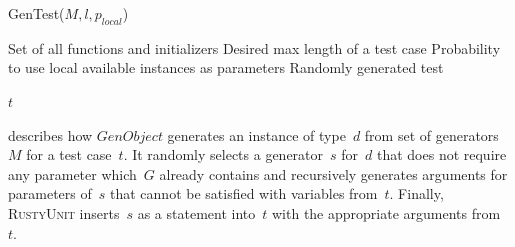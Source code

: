 \documentclass[paper=a4,%
  twoside,%
  BCOR4mm,%
  abstract=true,%
  toc=bibliography,%
  chapterprefix=true,%
  toc=bibliographynumbered,%
  open=right,%
  english,%
  pagesize=pdftex]{scrreprt}
\newcommand{\Desc}[2]{\State \makebox[2em][l]{#1}#2}
\newcommand{\tech}{\textsc{RustyUnit}\xspace}
\begin{document}
\begin{algorithm}[t]
\caption{GenTest($M, l, p_{local}$)}\label{alg:gentest}
\begin{algorithmic}
\Input
  \Desc{$M$}{Set of all functions and initializers}
  \Desc{$l$}{Desired max length of a test case}
  \Desc{$p_{local~}$}{Probability to use local available instances as parameters}
\EndInput
\Output
  \Desc{$t$}{Randomly generated test}
\EndOutput
{}

\EndFor
{}

    \EndIf
  \EndFor
\EndWhile
\State \Return $t$
\end{algorithmic}
\end{algorithm}

 describes how $GenObject$ generates an instance of type~$d$ from set of generators~$M$ for a test case~$t$. It randomly selects a generator~$s$ for~$d$ that does not require any parameter which~$G$ already contains and recursively generates arguments for parameters of~$s$ that cannot be satisfied with variables from~$t$. Finally, \tech inserts~$s$ as a statement into~$t$ with the appropriate arguments from~$t$.
\end{document}
